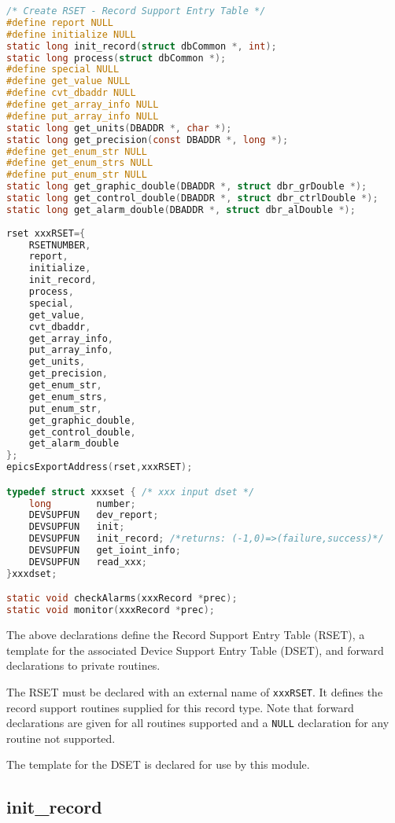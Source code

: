 \begin{lstlisting}[language=C]
/* Create RSET - Record Support Entry Table */
#define report NULL
#define initialize NULL
static long init_record(struct dbCommon *, int);
static long process(struct dbCommon *);
#define special NULL
#define get_value NULL
#define cvt_dbaddr NULL
#define get_array_info NULL
#define put_array_info NULL
static long get_units(DBADDR *, char *);
static long get_precision(const DBADDR *, long *);
#define get_enum_str NULL
#define get_enum_strs NULL
#define put_enum_str NULL
static long get_graphic_double(DBADDR *, struct dbr_grDouble *);
static long get_control_double(DBADDR *, struct dbr_ctrlDouble *);
static long get_alarm_double(DBADDR *, struct dbr_alDouble *);
 
rset xxxRSET={
	RSETNUMBER,
	report,
	initialize,
	init_record,
	process,
	special,
	get_value,
	cvt_dbaddr,
	get_array_info,
	put_array_info,
	get_units,
	get_precision,
	get_enum_str,
	get_enum_strs,
	put_enum_str,
	get_graphic_double,
	get_control_double,
	get_alarm_double
};
epicsExportAddress(rset,xxxRSET);

typedef struct xxxset { /* xxx input dset */
	long		number;
	DEVSUPFUN	dev_report;
	DEVSUPFUN	init;
	DEVSUPFUN	init_record; /*returns: (-1,0)=>(failure,success)*/
	DEVSUPFUN	get_ioint_info;
	DEVSUPFUN	read_xxx;
}xxxdset;

static void checkAlarms(xxxRecord *prec);
static void monitor(xxxRecord *prec);
\end{lstlisting}

The above declarations define the Record Support Entry Table (RSET), a template for the associated Device Support Entry Table (DSET), and forward declarations to private routines.

The RSET must be declared with an external name of \verb|xxxRSET|. It defines the record support routines supplied for this record type.
Note that forward declarations are given for all routines supported and a \verb|NULL| declaration for any routine not supported.

The template for the DSET is declared for use by this module.

\subsection{init\_record}

